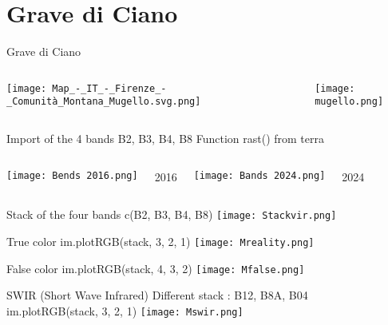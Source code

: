\documentclass{beamer}
\begin{document}
\section{Grave di Ciano}


\begin{frame}{Grave di Ciano}
    \begin{columns}
        \centering
        \texttt{[image: Map\_-\_IT\_-\_Firenze\_-\_Comunità\_Montana\_Mugello.svg.png]}
         
        \centering
        \texttt{[image: mugello.png]}
    \end{columns} 
\end{frame}

\begin{frame}{Import of the 4 bands B2, B3, B4, B8}
    \centering
Function rast() from terra
    \begin{columns}
        \centering
        \texttt{[image: Bends 2016.png]}
        \caption{2016}
         
        \centering
        \texttt{[image: Bands 2024.png]}
        \caption{2024}
    \end{columns} 
\end{frame}

\begin{frame}{Stack of the four bands}
     \centering
    c(B2, B3, B4, B8)
    \texttt{[image: Stackvir.png]}
\end{frame}

\begin{frame}{True color}
     \centering
     im.plotRGB(stack, 3, 2, 1)
    \texttt{[image: Mreality.png]}
\end{frame}

\begin{frame}{False color}
     \centering
     im.plotRGB(stack, 4, 3, 2)
    \texttt{[image: Mfalse.png]}
\end{frame}

\begin{frame}{SWIR (Short Wave Infrared)}
     \centering
     Different stack :  B12, B8A, B04 \\
     im.plotRGB(stack, 3, 2, 1)
    \texttt{[image: Mswir.png]} 
\end{frame}
\end{document}
